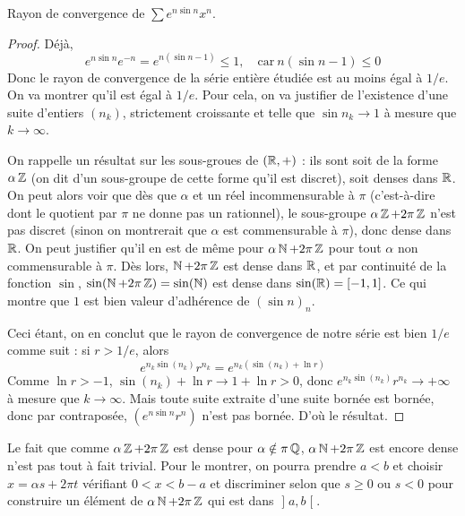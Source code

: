 \documentclass[10pt]{scrartcl}
\begin{document}
    \begin{exo}
        Rayon de convergence de $\sum e^{n\sin n}x^n$.
    \end{exo}

    \begin{proof}
        Déjà, 
        \[
            e^{n\sin n}e^{-n}=e^{n(\sin n - 1)}\leq 1,\quad \text{car}\ n(\sin n - 1)\leq 0
        \]
        Donc le rayon de convergence de la série entière étudiée est au moins égal à $1/e$. 
        On va montrer qu'il est égal à $1/e$. 
        Pour cela, on va justifier de l'existence d'une suite d'entiers $(n_k)$, strictement croissante et telle que 
        $\sin n_k\to 1$ à mesure que $k\to\infty$. 

        On rappelle un résultat sur les sous-groues de $(\operatorname{\mathbb R},+)$ : ils sont soit de la forme $\alpha\operatorname{\mathbb Z}$ (on dit d'un sous-groupe de cette forme qu'il est discret), soit denses dans $\operatorname{\mathbb R}$.
        On peut alors voir que dès que $\alpha$ et un réel incommensurable à $\pi$ (c'est-à-dire dont le quotient par $\pi$ ne donne pas un rationnel),
        le sous-groupe $\alpha\operatorname{\mathbb Z}+2\pi\operatorname{\mathbb Z}$ n'est pas discret (sinon on montrerait que $\alpha$ est commensurable à $\pi$), donc dense dans $\operatorname{\mathbb R}$.
        On peut justifier qu'il en est de même pour $\alpha\operatorname{\mathbb N}+2\pi\operatorname{\mathbb Z}$ pour tout $\alpha$ non commensurable à $\pi$. 
        Dès lors, $\operatorname{\mathbb N}+2\pi\operatorname{\mathbb Z}$ est dense dans $\operatorname{\mathbb R}$, et par continuité de la fonction $\sin$, $\sin(\operatorname{\mathbb N}+2\pi\operatorname{\mathbb Z})=\sin(\operatorname{\mathbb N})$ est dense dans $\sin(\operatorname{\mathbb R})=[-1,1]$.
        Ce qui montre que $1$ est bien valeur d'adhérence de $(\sin n)_n$. 

        Ceci étant, on en conclut que le rayon de convergence de notre série est bien $1/e$ comme suit : si $r>1/e$, alors 
        \[
            e^{n_k\sin(n_k)}r^{n_k}=e^{n_k(\sin(n_k)+\ln r)}
        \]
        Comme $\ln r > -1$, $\sin(n_k) + \ln r \to 1 + \ln r > 0$, donc $e^{n_k\sin(n_k)}r^{n_k}\to +\infty$ à mesure que $k\to\infty$. 
        Mais toute suite extraite d'une suite bornée est bornée, donc par contraposée, $(e^{n\sin n}r^n)$ n'est pas bornée. D'où le résultat.
    \end{proof}

    \begin{remarks}
        Le fait que comme $\alpha\operatorname{\mathbb Z} + 2\pi\operatorname{\mathbb Z}$ est dense pour $\alpha\notin\pi\operatorname{\mathbb Q}$, $\alpha\operatorname{\mathbb N}+2\pi\operatorname{\mathbb Z}$ est encore dense n'est 
        pas tout à fait trivial. 
        Pour le montrer, on pourra prendre $a<b$ et choisir $x=\alpha s + 2\pi t$ vérifiant $0 < x < b-a$
        et discriminer selon que $s\geq 0$ ou $s < 0$ pour construire un élément de $\alpha\operatorname{\mathbb N}+2\pi\operatorname{\mathbb Z}$ qui est dans $\mathopen]a,b\mathclose[$.
    \end{remarks}
\end{document}
